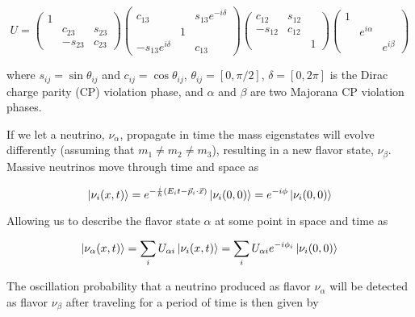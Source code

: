 \begin{equation}	
	U = 
	\begin{pmatrix}
		1 & & \\
		& c_{23} & s_{23} \\
		& -s_{23} & c_{23}
	\end{pmatrix}
	\begin{pmatrix}
		c_{13} & & s_{13}e^{-i\delta} \\
		& 1 &	\\
		-s_{13}e^{i\delta} & & c_{13}
	\end{pmatrix}
	\begin{pmatrix}
		c_{12} & s_{12} & \\
		-s_{12} & c_{12} & \\
		& & 1
	\end{pmatrix}
	\begin{pmatrix}
		1 & & \\
		& e^{i\alpha}  & \\
		& & e^{i\beta}
	\end{pmatrix}
\end{equation}

where $s_{ij} = \sin\theta_{ij}$ and $c_{ij} = \cos\theta_{ij}$, $\theta_{ij} = [0,\pi/2]$,
$\delta = [0,2\pi]$ is the Dirac charge parity (CP) violation phase, and $\alpha$ and $\beta$ are two Majorana CP violation phases.

If we let a neutrino, $\nu_\alpha$, propagate in time the mass eigenstates will evolve differently (assuming that $m_{1} \neq m_{2} \neq m_{3}$), resulting in a new flavor state, $\nu_{\beta}$.
Massive neutrinos move through time and space as

\begin{equation}
	\ket{\nu_i(x,t)} = e^{-\frac{i}{\hbar}(E_{i}t-\vec{p}_{i}\cdot\vec{x})}\ket{\nu_i(0,0)} = e^{-i\phi}\ket{\nu_i(0,0)} 
\end{equation}

Allowing us to describe the flavor state $\alpha$ at some point in space and time as

\begin{equation}
	\ket{\nu_{\alpha}(x,t)} = \sum_{i}U_{\alpha i}\ket{\nu_{i}(x,t)} = \sum_{i}U_{\alpha i}e^{-i\phi_{i}}\ket{\nu_{i}(0,0)}
\end{equation}

The oscillation probability that a neutrino produced as flavor $\nu_\alpha$ will be detected as flavor $\nu_\beta$ after traveling for a period of time is then given by

